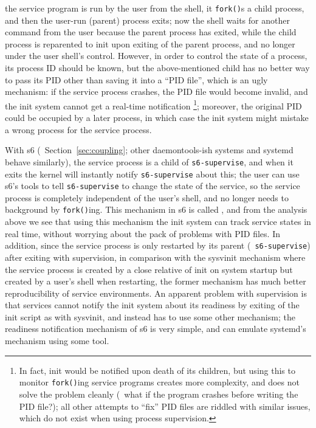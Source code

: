 the service program is run by the user from the shell, it \verb|fork()|s a child
process, and then the user-run (parent) process exits; now the shell waits for
another command from the user because the parent process has exited, while
the child process is reparented to init upon exiting of the parent process, and
no longer under the user shell's control.  However, in order to control the
state of a process, its process ID should be known, but the above-mentioned
child has no better way to pass its PID other than saving it into a ``PID
file'', which is an ugly mechanism: if the service process crashes, the PID file
would become invalid, and the init system cannot get a real-time notification%
\footnote{In fact, init would be notified upon death of its children, but using
this to monitor \texttt{fork()}ing service programs creates more complexity,
and does not solve the problem cleanly (\eg~what if the program crashes before
writing the PID file?); all other attempts to ``fix'' PID files are riddled
with similar issues, which do not exist when using process supervision.};
moreover, the original PID could be occupied by a later process, in which
case the init system might mistake a wrong process for the service process.

With s6 (\cf~Section~\ref{sec:coupling}; other daemontools-ish systems
and systemd behave similarly), the service process is a child of
\verb|s6-supervise|, and when it exits the kernel will instantly notify
\verb|s6-supervise| about this; the user can use s6's tools to tell
\verb|s6-supervise| to change the state of the service, so the service
process is completely independent of the user's shell, and no longer
needs to background by \verb|fork()|ing.  This mechanism in s6 is called
, and from the analysis above we see that using
this mechanism the init system can track service states in real time, without
worrying about the pack of problems with PID files.  In addition, since the
service process is only restarted by its parent (\eg~\verb|s6-supervise|)
after exiting with supervision, in comparison with the sysvinit mechanism
where the service process is created by a close relative of init on system
startup but created by a user's shell when restarting, the former mechanism
has much better reproducibility of service environments.  An apparent
problem with supervision is that services cannot notify the init system
about its readiness by exiting of the init script as with sysvinit,
and instead has to use some other mechanism; the readiness notification
mechanism of s6 is very simple, and can emulate
systemd's mechanism using some tool.

